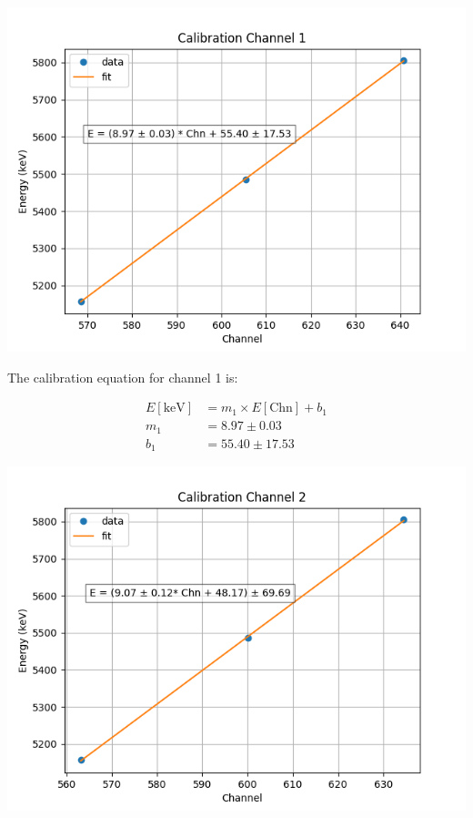 \documentclass{article}
\begin{document}
\begin{multicols}{2}
\begin{center}
    \label{TT_21}
    \centering
    \includegraphics[scale = 0.6]{images/TT_21_Chn1_calib.png}
\end{center}

The calibration equation for channel 1 is:

\begin{equation}
    \begin{split}
        E[\text{keV}] &= m_1 \times E[\text{Chn}] + b_1 \\
        m_1 &= 8.97 \pm 0.03 \\
        b_1 &= 55.40 \pm 17.53
    \end{split}
    \label{eq:calib1}
\end{equation}

\begin{center}
    \label{TT_21}
    \centering
    \includegraphics[scale = 0.6]{images/TT_21_Chn2_calib.png}
\end{center}


\end{multicols}
\end{document}
